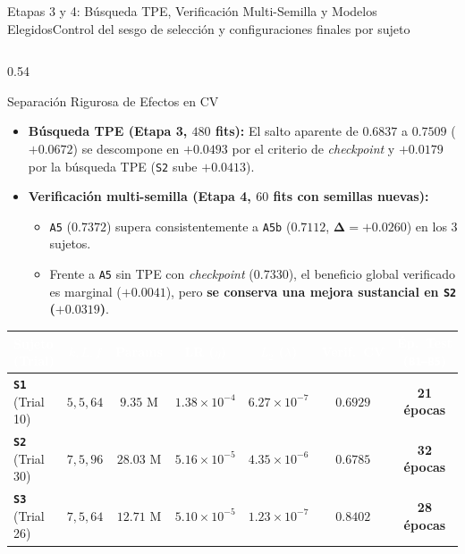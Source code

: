 \begin{frame}{Etapas 3 y 4: B\'usqueda TPE, Verificaci\'on Multi-Semilla y Modelos Elegidos}{Control del sesgo de selecci\'on y configuraciones finales por sujeto \cite{cawley2010overfitting,rodas_valencia_tpe_ecog}}
  \begin{columns}[T,onlytextwidth]
    \begin{column}{0.54\textwidth}
      \scriptsize
      \begin{block}{Separaci\'on Rigurosa de Efectos en CV}
        \begin{itemize}\setlength{\itemsep}{2pt}
          \item \textbf{B\'usqueda TPE (Etapa 3, $480$ fits):} El salto aparente de $0.6837$ a $0.7509$ ($+0.0672$) se descompone en $\mathbf{+0.0493}$ por el criterio de \textit{checkpoint} y $\mathbf{+0.0179}$ por la b\'usqueda TPE (\texttt{S2} sube $+0.0413$).
          \item \textbf{Verificaci\'on multi-semilla (Etapa 4, $60$ fits con semillas nuevas):}
            \begin{itemize}\scriptsize
              \item \texttt{A5} ($\mathbf{0.7372}$) supera consistentemente a \texttt{A5b} ($0.7112$, $\mathbf{\Delta = +0.0260}$) en los 3 sujetos.
              \item Frente a \texttt{A5} sin TPE con \textit{checkpoint} ($0.7330$), el beneficio global verificado es marginal ($\mathbf{+0.0041}$), pero \textbf{se conserva una mejora sustancial en \texttt{S2} ($\mathbf{+0.0319}$)}.
            \end{itemize}
        \end{itemize}
      \end{block}

      \centering
      \renewcommand{\arraystretch}{1.15}
      \setlength{\tabcolsep}{3pt}
      {\tiny
      \begin{tabular}{@{} l c c c c c c @{}}
        \toprule
        \rowcolor{ipnDark}
        \textcolor{white}{\textbf{Sujeto (Trial)}} &
        \textcolor{white}{\textbf{$k, L, f$}} &
        \textcolor{white}{\textbf{Params}} &
        \textcolor{white}{\textbf{LR ($\eta$)}} &
        \textcolor{white}{\textbf{$L_2$ ($\lambda$)}} &
        \textcolor{white}{\textbf{Verif.\ CV}} &
        \textcolor{white}{\textbf{\'Ep.\ Test (\texttt{B1--B5})}} \\
        \midrule
        \textbf{\texttt{S1}} (Trial 10) & $5, 5, 64$ & $9.35\text{ M}$ & $1.38\times 10^{-4}$ & $6.27\times 10^{-7}$ & $0.6929$ & \textbf{21 \'epocas} \\
        \rowcolor{rowHighlight}
        \textbf{\texttt{S2}} (Trial 30) & $7, 5, 96$ & $28.03\text{ M}$ & $5.16\times 10^{-5}$ & $4.35\times 10^{-6}$ & $0.6785$ & \textbf{32 \'epocas} \\
        \textbf{\texttt{S3}} (Trial 26) & $7, 5, 64$ & $12.71\text{ M}$ & $5.10\times 10^{-5}$ & $1.23\times 10^{-7}$ & $0.8402$ & \textbf{28 \'epocas} \\
        \bottomrule
      \end{tabular}}
    \end{column}


\end{columns}
\end{frame}
